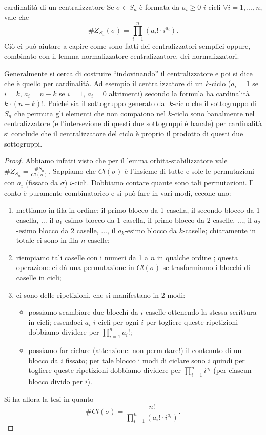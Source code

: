 \begin{proposition}{cardinalità di un centralizzatore}
    Se $\sigma \in S_n$ è formata da $a_i \geq 0$ $i$-cicli $\forall i = 1,\dots,n$, vale che \[ \#Z_{S_n}(\sigma) = \prod_{i=1}^n (a_i!\cdot i^{a_i}). \]
    Ciò ci può aiutare a capire come sono fatti dei centralizzatori semplici oppure, combinato con il lemma normalizzatore-centralizzatore, dei normalizzatori.
    
    Generalmente si cerca di costruire ``indovinando'' il centralizzatore e poi si dice che è quello per cardinalità. Ad esempio il centralizzatore di un $k$-ciclo ($a_i = 1$ se $i = k$, $a_i = n-k$ se $i = 1$, $a_i = 0$ altrimenti) secondo la formula ha cardinalità $k \cdot (n-k)!$. Poiché sia il sottogruppo generato dal $k$-ciclo che il sottogruppo di $S_n$ che permuta gli elementi che non compaiono nel $k$-ciclo sono banalmente nel centralizzatore (e l'intersezione di questi due sottogruppi è banale) per cardinalità si conclude che il centralizzatore del ciclo è proprio il prodotto di questi due sottogruppi. 
\end{proposition}
\begin{proof}
    Abbiamo infatti visto che per il lemma orbita-stabilizzatore vale $\#Z_{S_n} = \frac{\#S_n}{Cl(\sigma)}$. Sappiamo che $Cl(\sigma)$ è l'insieme di tutte e sole le permutazioni con $a_i$ (fissato da $\sigma$) $i$-cicli. Dobbiamo contare quante sono tali permutazioni. Il conto è puramente combinatorico e si può fare in vari modi, eccone uno: 
    \begin{enumerate}
        \item mettiamo in fila in ordine: il primo blocco da 1 casella, il secondo blocco da 1 casella, $\dots$ il $a_1$-esimo blocco da 1 casella, il primo blocco da 2 caselle, $\dots$, il $a_2$-esimo blocco da 2 caselle, $\dots$, il $a_k$-esimo blocco da $k$-caselle; chiaramente in totale ci sono in fila $n$ caselle;
        \item riempiamo tali caselle con i numeri da 1 a $n$ in qualche ordine ; questa operazione ci dà una permutazione in $Cl(\sigma)$ se trasformiamo i blocchi di caselle in cicli;
        \item ci sono delle ripetizioni, che si manifestano in 2 modi:
        \begin{itemize}
            \item possiamo scambiare due blocchi da $i$ caselle ottenendo la stessa scrittura in cicli; essendoci $a_i$ $i$-cicli per ogni $i$ per togliere queste ripetizioni dobbiamo dividere per $\prod_{i=1}^n a_i!$;
            \item possiamo far ciclare (attenzione: non permutare!) il contenuto di un blocco da $i$ fissato; per tale blocco i modi di ciclare sono $i$ quindi per togliere queste ripetizioni dobbiamo dividere per $\prod_{i=1}^n i^{a_i}$ (per ciascun blocco divido per $i$).
        \end{itemize}
    \end{enumerate}
    Si ha allora la tesi in quanto \[ \#Cl(\sigma) = \frac{n!}{\prod_{i=1}^n (a_i!\cdot i^{a_i})}. \]
\end{proof}
